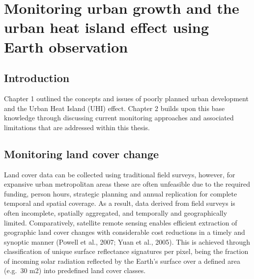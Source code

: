 \documentclass[]{book}
\begin{document}
\chapter{Monitoring urban growth and the urban heat island effect using
Earth
observation}\label{monitoring-urban-growth-and-the-urban-heat-island-effect-using-earth-observation}

\section{Introduction}\label{introduction-2}

Chapter 1 outlined the concepts and issues of poorly planned urban
development and the Urban Heat Island (UHI) effect. Chapter 2 builds
upon this base knowledge through discussing current monitoring
approaches and associated limitations that are addressed within this
thesis.

\section{Monitoring land cover
change}\label{monitoring-land-cover-change}

Land cover data can be collected using traditional field surveys,
however, for expansive urban metropolitan areas these are often
unfeasible due to the required funding, person hours, strategic planning
and annual replication for complete temporal and spatial coverage. As a
result, data derived from field surveys is often incomplete, spatially
aggregated, and temporally and geographically limited. Comparatively,
satellite remote sensing enables efficient extraction of geographic land
cover changes with considerable cost reductions in a timely and synoptic
manner (Powell et al., 2007; Yuan et al., 2005). This is achieved
through classification of unique surface reflectance signatures per
pixel, being the fraction of incoming solar radiation reflected by the
Earth's surface over a defined area (e.g.~30 m2) into predefined land
cover classes.
\end{document}
